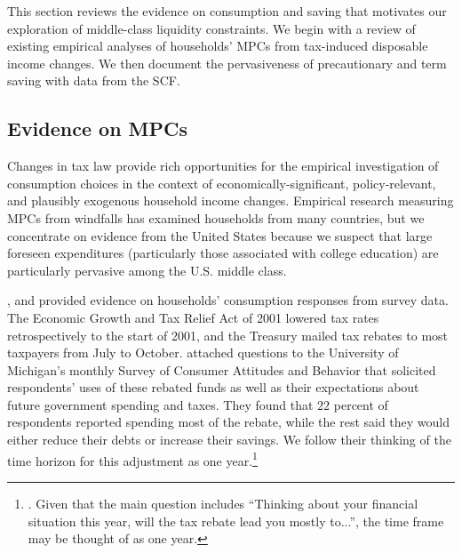 \documentclass[fleqccn,12pt]{article}
\begin{document}
This section reviews the evidence on consumption and saving that motivates our exploration of middle-class liquidity constraints. We begin with a review of existing empirical analyses of households' MPCs from tax-induced disposable income changes. We then document the pervasiveness of precautionary and term saving with data from the SCF. 

\subsection{Evidence on MPCs\label{mpc estimates}}

Changes in tax law provide rich opportunities for the empirical investigation of consumption choices in the context of economically-significant, policy-relevant, and plausibly exogenous household income changes. Empirical research measuring MPCs from windfalls has examined households from many countries, but we concentrate on evidence from the United States because we suspect that large foreseen expenditures (particularly those associated with college education) are particularly pervasive among the U.S. middle class.  

\citet{aer2003ShapiroSlemrod,aer2009ShapiroSlemrod}, and \citet*{taxPolicy2010SahmShapiroSlemrod} provided evidence on households' consumption responses from survey data. The Economic Growth and Tax Relief Act of 2001 lowered tax rates retrospectively to the start of 2001, and the Treasury mailed tax rebates to most taxpayers from July to October. \citeauthor*{aer2003ShapiroSlemrod} attached questions to the University of Michigan's monthly Survey of Consumer Attitudes and Behavior that solicited respondents' uses of these rebated funds as well as their expectations about future government spending and taxes. They found that $22$ percent of respondents reported spending most of the rebate, while the rest said they would either reduce their debts or increase their savings. We follow their thinking of the time horizon for this adjustment as one year.\footnote{\citet*[page 383]{aer2003ShapiroSlemrod}. Given that the main question includes \textquotedblleft Thinking about your financial situation this year, will the tax rebate lead you mostly to...\textquotedblright, the time frame may be thought of as one year.}
\end{document}
